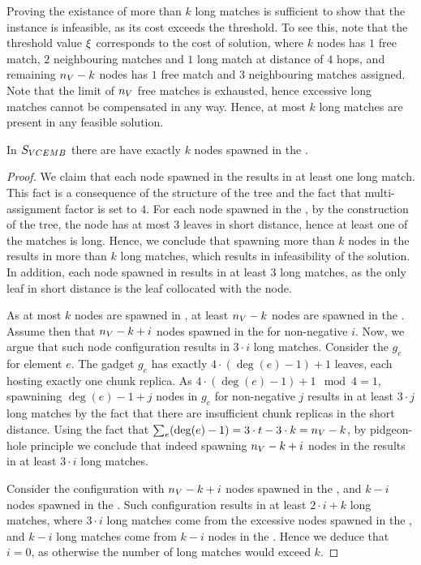 Proving the existance of more than $k$ long matches is sufficient to show that the instance is infeasible, as its cost exceeds the threshold.
To see this, note that the threshold value $\xi$ corresponds to the cost of solution, where $k$ nodes has $1$ free match, $2$ neighbouring matches and $1$ long match at distance of $4$ hops, and remaining $n_V-k$ nodes has $1$ free match and $3$ neighbouring matches assigned.
Note that the limit of $n_V$ free matches is exhausted, hence excessive long matches cannot be compensated in any way.
Hence, at most $k$ long matches are present in any feasible solution.


\begin{lemma}
  In $S_{VCEMB}$ there are have exactly $k$ nodes spawned in the \MatchSubtree.
  \label{lem:n-matchsubtree-ma}
\end{lemma}

\begin{proof}
 We claim that each node spawned in the \MatchSubtree{} results in at least one long match.
This fact is a consequence of the structure of the tree and the fact that multi-assignment factor is set to $4$.
For each node spawned in the \MatchSubtree{}, by the construction of the tree, the node has at most $3$ leaves in short distance, hence at least one of the matches is long.
Hence, we conclude that spawning more than $k$ nodes in the \MatchSubtree{} results in more than $k$ long matches, which results in infeasibility of the solution.
In addition, each node spawned in \UnqGadget{} results in at least $3$ long matches, as the only leaf in short distance is the leaf collocated with the node.

As at most $k$ nodes are spawned in \MatchSubtree{}, at least $n_V-k$ nodes are spawned in the \CoverSubtree.
Assume then that $n_V-k+i$ nodes spawned in the \CoverSubtree{} for non-negative $i$.
Now, we argue that such node configuration results in $3\cdot i$ long matches.
Consider the \ElGadget{} $g_e$ for element $e$.
The gadget $g_e$ has exactly $4\cdot(\deg(e)-1)+1$ leaves, each hosting exactly one chunk replica.
As $4\cdot(\deg(e)-1)+1 \mod 4 = 1$, spawnining $\deg(e)-1+j$ nodes in $g_e$ for non-negative $j$ results in at least $3\cdot j$ long matches by the fact that there are insufficient chunk replicas in the short distance.
Using the fact that $\sum_e(\deg(e)-1) = 3\cdot t - 3\cdot k = n_V - k$, by pidgeon-hole principle we conclude that indeed spawning $n_V-k+i$ nodes in the \CoverSubtree{} results in at least $3\cdot i$ long matches.

Consider the configuration with $n_V-k+i$ nodes spawned in the \CoverSubtree{}, and $k-i$ nodes spawned in the \MatchSubtree{}.
Such configuration results in at least $2\cdot i + k$ long matches, where $3\cdot i$ long matches come from the excessive nodes spawned in the \CoverSubtree{}, and $k-i$ long matches come from $k-i$ nodes in the \MatchSubtree{}.
Hence we deduce that $i = 0$, as otherwise the number of long matches would exceed $k$.

\end{proof}


